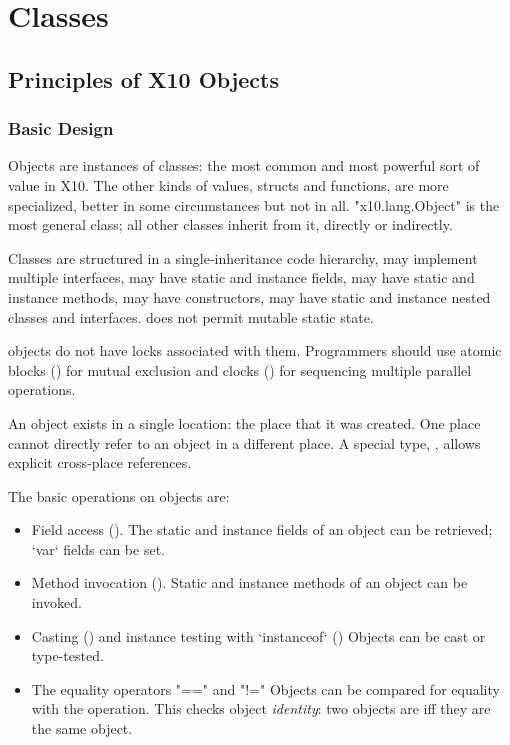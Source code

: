\chapter{Classes}
\label{XtenClasses}
\label{ReferenceClasses}

\section{Principles of X10 Objects}\label{XtenObjects}

\subsection{Basic Design}

Objects are instances of classes: the most common and most powerful sort of
value in X10.  The other kinds of values, structs and functions, are more
specialized, better in some circumstances but not in all.
\xcd"x10.lang.Object" is the most general class; all other classes inherit
from it, directly or indirectly. 


Classes are structured in a single-inheritance code
hierarchy, may implement multiple interfaces, may have static and
instance fields, may have static and instance methods, may have
constructors, 
may have static and instance nested classes and interfaces. \Xten{} does not
permit mutable static state.

\Xten{} objects do not have locks associated with them.
Programmers should use atomic blocks () for mutual
exclusion and clocks () for sequencing multiple parallel
operations.

An object exists in a single location: the place that it was created.  One
place cannot directly refer to an object in a different place.   A
special type, , allows explicit cross-place references. 

The basic operations on objects are:
\begin{itemize}

{}\item Field access (). 
The static and instance fields of an object can be retrieved; \xcd`var` fields
can be set.  

{}\item Method invocation ().  
Static and instance methods of an object can be invoked.

{}\item Casting () and instance testing with \xcd`instanceof`
() Objects can be cast or type-tested.  

\item The equality operators \xcd"==" and \xcd"!="
Objects can be compared for equality with the \Xcd{==} operation.  This checks
object {\em identity}: two objects are \Xcd{==} iff they are the same object.

\end{itemize}

